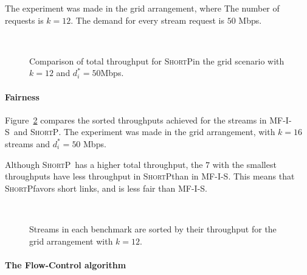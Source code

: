 \documentclass[12pt]{article}
\newenvironment{proof sketch}[1]{\noindent {\emph{Proof sketch of #1:}}}{\hfill \qed}
\newcommand{\algA}{\textsc{MF-I-S}}
\newcommand{\algB}{\textsc{ShortP}}
\newcommand{\algS}{\algB}
\begin{document}
The experiment was made in the grid arrangement, where The number of requests is $k=12$.
The demand for every stream request is $50$ Mbps.

\begin{figure}[h!]
      \centering
        \\
        \caption{Comparison of total throughput for \algS in the grid
          scenario with $k=12$ and $d^*_i=50$Mbps. }
      \label{fig:radio13}
     \end{figure}

\paragraph{Fairness}
Figure~\ref{fig:fair} compares the sorted throughputs achieved for the
streams in \algA\ and \algS.  The experiment was made in the grid
arrangement, with $k=16$ streams and $d^*_i=50$ Mbps.

Although \algS\ has a higher total throughput, the $7$ with the
smallest throughputs have less throughput in \algS than in \algA.
This means that \algS favors short links, and is less fair than \algA.
\begin{figure}[h!]
      \centering
        \\
        \caption{Streams in each benchmark are sorted by their
          throughput for the grid arrangement with $k=12$. }
      \label{fig:fair}
     \end{figure}

\paragraph{The Flow-Control algorithm}
\end{document}
